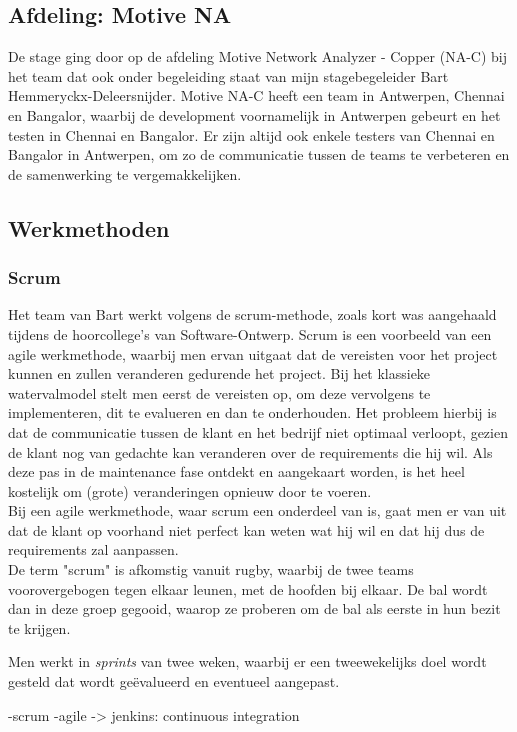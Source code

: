 \documentclass[10pt,a4paper]{article}
\begin{document}
\subsection{Afdeling: Motive NA}
De stage ging door op de afdeling Motive Network Analyzer - Copper (NA-C) bij het team dat ook onder begeleiding staat van mijn stagebegeleider Bart Hemmeryckx-Deleersnijder. Motive NA-C heeft een team in Antwerpen, Chennai en Bangalor, waarbij de development voornamelijk in Antwerpen gebeurt en het testen in Chennai en Bangalor. Er zijn altijd ook enkele testers van Chennai en Bangalor in Antwerpen, om zo de communicatie tussen de teams te verbeteren en de samenwerking te vergemakkelijken.
\subsection{Werkmethoden}
\subsubsection{Scrum}
Het team van Bart werkt volgens de scrum-methode, zoals kort was aangehaald tijdens de hoorcollege's van Software-Ontwerp. Scrum is een voorbeeld van een agile werkmethode, waarbij men ervan uitgaat dat de vereisten voor het project kunnen en zullen veranderen gedurende het project. Bij het klassieke watervalmodel stelt men eerst de vereisten op, om deze vervolgens te implementeren, dit te evalueren en dan te onderhouden. Het probleem hierbij is dat de communicatie tussen de klant en het bedrijf 
niet optimaal verloopt, gezien de klant nog van gedachte kan veranderen over de requirements die hij wil. Als deze pas in de maintenance fase ontdekt en aangekaart worden, is het heel kostelijk om (grote) veranderingen opnieuw door te voeren.\\
Bij een agile werkmethode, waar scrum een onderdeel van is, gaat men er van uit dat de klant op voorhand niet perfect kan weten wat hij wil en dat hij dus de requirements zal aanpassen.\\
De term "scrum" is afkomstig vanuit rugby, waarbij de twee teams voorovergebogen tegen elkaar leunen, met de hoofden bij elkaar. De bal wordt dan in deze groep gegooid, waarop ze proberen om de bal als eerste in hun bezit te krijgen.


Men werkt in \textit{sprints} van twee weken, waarbij er een tweewekelijks doel wordt gesteld dat wordt ge\"evalueerd en eventueel aangepast.

-scrum
-agile
-> jenkins: continuous integration
\end{document}

